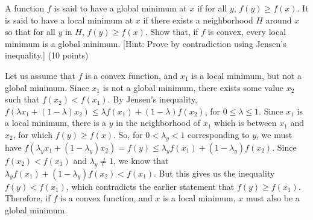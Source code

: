 \documentclass[fleqn]{homework}
\begin{document}
  \begin{problem}{2}
    \begin{question}
      A function $f$ is said to have a global minimum at $x$ if for all $y$,
      $f(y) \ge f(x)$.  It is said to have a local minimum at $x$ if there
      exists a neighborhood $H$ around $x$ so that for all $y$ in $H$,
      $f(y) \ge f(x)$.  Show that, if $f$ is convex, every local minimum is a
      global minimum.  [Hint: Prove by contradiction using Jensen's inequality.]
      (10 points)
    \end{question}

    Let us assume that $f$ is a convex function, and $x_1$ is a local minimum,
    but not a global minimum.  Since $x_1$ is not a global minimum, there exists
    some value $x_2$ such that $f(x_2) < f(x_1)$.  By Jensen's inequality,
    $f(\lambda x_1 + (1-\lambda) x_2) \le \lambda f(x_1) + (1-\lambda) f(x_2)$,
    for $0 \le \lambda \le 1$.  Since $x_1$ is a local minimum, there is a $y$
    in the neighborhood of $x_1$ which is between $x_1$ and $x_2$, for which
    $f(y) \ge f(x)$.  So, for $0 < \lambda_y < 1$ corresponding to $y$, we must
    have
    $f(\lambda_y x_1 + (1-\lambda_y) x_2) = f(y) \le \lambda_y f(x_1) +
    (1-\lambda_y) f(x_2)$.
    Since $f(x_2) < f(x_1)$ and $\lambda_y \ne 1$, we know that
    $\lambda_y f(x_1) + (1-\lambda_y) f(x_2) < f(x_1)$.  But this gives us the
    inequality $f(y) < f(x_1)$, which contradicts the earlier statement that
    $f(y) \ge f(x_1)$.  Therefore, if $f$ is a convex function, and $x$ is a
    local minimum, $x$ must also be a global minimum.
  \end{problem}
\end{document}
